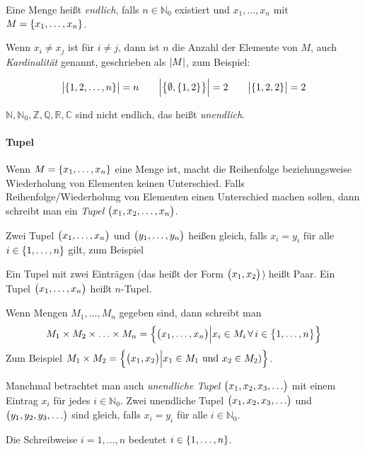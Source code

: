 \documentclass{scrreprt}
\begin{document}
Eine Menge heißt \emph{endlich}, falls $n \in \mathbb{N}_0$ existiert und
$x_1, \ldots, x_n$ mit $M = \qty{x_1, \ldots, x_n}$.

Wenn $x_i \ne x_j$ ist für $i \ne j$, dann ist $n$ die Anzahl der Elemente von
$M$, auch \emph{Kardinalität} genannt, geschrieben als $\abs{M}$, zum Beispiel:

\[
  \abs\big{\qty{1, 2, \ldots, n}} = n \qquad
  \abs\Big{\qty\big{\emptyset, \qty{1, 2}}} = 2 \qquad
  \abs\big{\qty{1, 2, 2}} = 2
\]

$\mathbb{N}, \mathbb{N}_0, \mathbb{Z}, \mathbb{Q}, \mathbb{R}, \mathbb{C}$ sind
nicht endlich, das heißt \emph{unendlich}.

\newpage
\paragraph{Tupel}
Wenn $M = \qty{x_1, \ldots, x_n}$ eine Menge ist, macht die Reihenfolge
beziehungsweise Wiederholung von Elementen keinen Unterschied.
Falls Reihenfolge/Wiederholung von Elementen einen Unterschied machen sollen,
dann schreibt man ein \emph{Tupel} $\qty\big(x_1, x_2, \ldots, x_n)$.

Zwei Tupel $\qty\big(x_1, \ldots, x_n)$ und $\qty\big(y_1, \ldots, y_n)$ heißen
gleich, falls $x_i = y_i$ für alle $i \in \qty{1, \ldots, n}$ gilt, zum Beispiel
Ein Tupel mit zwei Einträgen (das heißt der Form $\qty\big(x_1, x_2)$) heißt Paar.
Ein Tupel $\qty\big(x_1, \ldots, x_n)$ heißt $n$-Tupel.

Wenn Mengen $M_1, \ldots, M_n$ gegeben sind, dann schreibt man
\[
  M_1 \times M_2 \times \ldots \times M_n =
  \qty\Big{
    \qty\big(x_1, \ldots, x_n) {\Big |}
    x_i \in M_i \, \forall \, i \in \qty\big{1, \ldots, n}
  }
\]
Zum Beispiel
$M_1 \times M_2 = \qty\Big{
\qty\big(x_1, x_2) {\Big |} x_1 \in M_1 \text{ und } x_2 \in M_2)}$.

Manchmal betrachtet man auch \emph{unendliche Tupel}
$\qty\big(x_1, x_2, x_3, \ldots)$ mit einem Eintrag $x_i$ für jedes
$i \in \mathbb{N}_0$.
Zwei unendliche Tupel $\qty\big(x_1, x_2, x_3, \ldots)$ und
$\qty\big(y_1, y_2, y_3, \ldots)$ sind gleich, falls
$x_i = y_i$ für alle $i \in \mathbb{N}_0$.

Die Schreibweise $i = 1, \ldots, n$ bedeutet $i \in \qty{1, \ldots, n}$.
\end{document}
